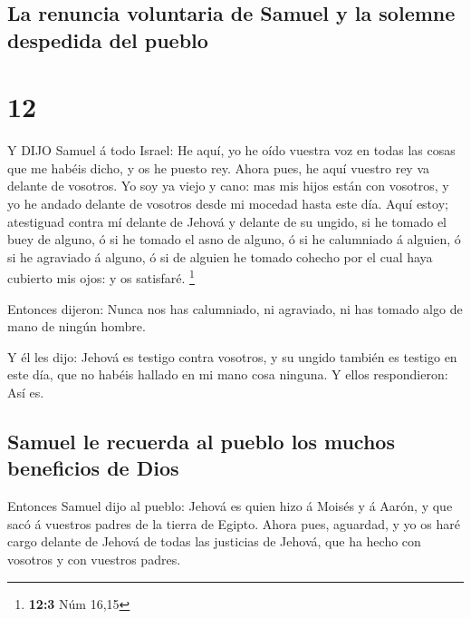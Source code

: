 \hypertarget{la-renuncia-voluntaria-de-samuel-y-la-solemne-despedida-del-pueblo}{%
\subsection{La renuncia voluntaria de Samuel y la solemne despedida del
pueblo}\label{la-renuncia-voluntaria-de-samuel-y-la-solemne-despedida-del-pueblo}}

\hypertarget{section-11}{%
\section{12}\label{section-11}}

 Y DIJO Samuel á todo Israel: He aquí, yo he oído vuestra
voz en todas las cosas que me habéis dicho, y os he puesto rey.
 Ahora pues, he aquí vuestro rey va delante de vosotros. Yo
soy ya viejo y cano: mas mis hijos están con vosotros, y yo he andado
delante de vosotros desde mi mocedad hasta este día.  Aquí
estoy; atestiguad contra mí delante de Jehová y delante de su ungido, si
he tomado el buey de alguno, ó si he tomado el asno de alguno, ó si he
calumniado á alguien, ó si he agraviado á alguno, ó si de alguien he
tomado cohecho por el cual haya cubierto mis ojos: y os satisfaré.
\footnote{\textbf{12:3} Núm 16,15}

 Entonces dijeron: Nunca nos has calumniado, ni agraviado,
ni has tomado algo de mano de ningún hombre.

 Y él les dijo: Jehová es testigo contra vosotros, y su
ungido también es testigo en este día, que no habéis hallado en mi mano
cosa ninguna. Y ellos respondieron: Así es.

\hypertarget{samuel-le-recuerda-al-pueblo-los-muchos-beneficios-de-dios}{%
\subsection{Samuel le recuerda al pueblo los muchos beneficios de
Dios}\label{samuel-le-recuerda-al-pueblo-los-muchos-beneficios-de-dios}}

 Entonces Samuel dijo al pueblo: Jehová es quien hizo á
Moisés y á Aarón, y que sacó á vuestros padres de la tierra de Egipto.
 Ahora pues, aguardad, y yo os haré cargo delante de Jehová
de todas las justicias de Jehová, que ha hecho con vosotros y con
vuestros padres.

